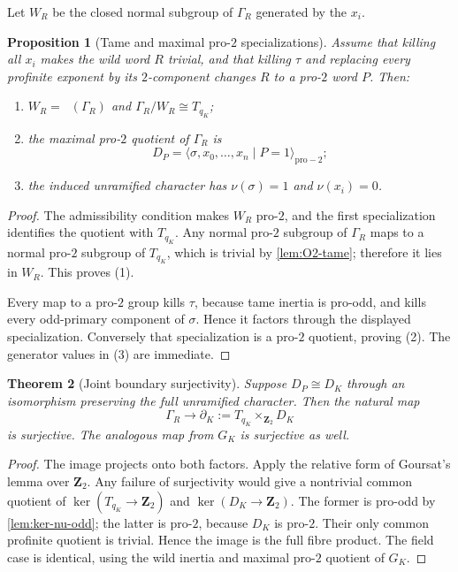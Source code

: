 \documentclass[11pt,reqno]{amsart}
\newtheorem{theorem}{Theorem}[section]
\newtheorem{proposition}[theorem]{Proposition}
\theoremstyle{remark}
\numberwithin{equation}{section}
\newcommand{\Z}{\mathbf Z}
\DeclareMathOperator{\Otwo}{O_2}
\begin{document}
Let \(W_R\) be the closed normal subgroup of \(\Gamma_R\) generated by
the \(x_i\).

\begin{proposition}[Tame and maximal pro-\(2\) specializations]
\label{prop:specializations}
Assume that killing all \(x_i\) makes the wild word \(R\) trivial, and
that killing \(\tau\) and replacing every profinite exponent by its
\(2\)-component changes \(R\) to a pro-\(2\) word \(P\).  Then:
\begin{enumerate}
\item \(W_R=\Otwo(\Gamma_R)\) and \(\Gamma_R/W_R\cong T_{q_K}\);
\item the maximal pro-\(2\) quotient of \(\Gamma_R\) is
\[
 D_P=\langle\sigma,x_0,\ldots,x_n\mid P=1\rangle_{\mathrm{pro}-2};
\]
\item the induced unramified character has
\(\nu(\sigma)=1\) and \(\nu(x_i)=0\).
\end{enumerate}
\end{proposition}

\begin{proof}
The admissibility condition makes \(W_R\) pro-\(2\), and the first
specialization identifies the quotient with \(T_{q_K}\).  Any normal
pro-\(2\) subgroup of \(\Gamma_R\) maps to a normal pro-\(2\) subgroup of
\(T_{q_K}\), which is trivial by \cref{lem:O2-tame}; therefore it lies in
\(W_R\).  This proves (1).

Every map to a pro-\(2\) group kills \(\tau\), because tame inertia is
pro-odd, and kills every odd-primary component of \(\sigma\).  Hence it
factors through the displayed specialization.  Conversely that
specialization is a pro-\(2\) quotient, proving (2).  The generator values
in (3) are immediate.
\end{proof}

\begin{theorem}[Joint boundary surjectivity]\label{thm:boundary}
Suppose \(D_P\cong D_K\) through an isomorphism preserving the full
unramified character.  Then the natural map
\[
 \Gamma_R\longrightarrow
 \partial_K:=T_{q_K}\times_{\Z_2}D_K
\]
is surjective.  The analogous map from \(G_K\) is surjective as well.
\end{theorem}

\begin{proof}
The image projects onto both factors.  Apply the relative form of
Goursat's lemma over \(\Z_2\).  Any failure of surjectivity would give a
nontrivial common quotient of
\(\ker(T_{q_K}\to\Z_2)\) and \(\ker(D_K\to\Z_2)\).  The former is pro-odd
by \cref{lem:ker-nu-odd}; the latter is pro-\(2\), because \(D_K\) is
pro-\(2\).  Their only common profinite quotient is trivial.  Hence the
image is the full fibre product.  The field case is identical, using the
wild inertia and maximal pro-\(2\) quotient of \(G_K\).
\end{proof}
\end{document}
